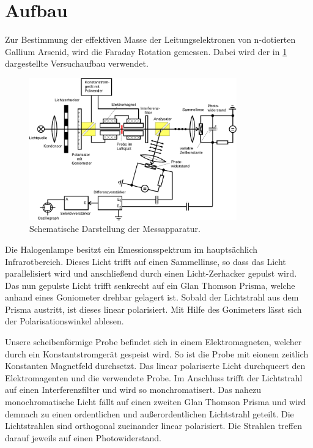 \section{Aufbau}
\label{sec:Aufbau}

Zur Bestimmung der effektiven Masse der Leitungselektronen von n-dotierten Gallium Arsenid, wird die Faraday Rotation
gemessen. Dabei wird der in \ref{fig:apparatur} dargestellte Versuchaufbau verwendet.

\begin{figure}[H]
    \centering
    \includegraphics[width=0.8\textwidth]{content/grafik/apparatur.pdf}
    \caption{Schematische Darstellung der Messapparatur. \cite{faraday}}
    \label{fig:apparatur}
\end{figure}

Die Halogenlampe besitzt ein Emessionsspektrum im hauptsächlich Infrarotbereich. Dieses Licht trifft auf einen
Sammellinse, so dass das Licht parallelisiert wird und anschließend durch einen Licht-Zerhacker gepulst wird.
Das nun gepulste Licht trifft senkrecht auf ein Glan Thomson Prisma, welche anhand eines Goniometer drehbar gelagert ist.
Sobald der Lichtstrahl aus dem Prisma austritt, ist dieses linear polarisiert. Mit Hilfe des Gonimeters lässt sich 
der Polarisationswinkel ablesen. 

Unsere scheibenförmige Probe befindet sich in einem Elektromagneten, welcher durch ein Konstantstromgerät gespeist wird.
So ist die Probe mit eionem zeitlich Konstanten Magnetfeld durchsetzt.
Das linear polariserte Licht durchqueert den Elektromagenten und die verwendete Probe.
Im Anschluss trifft der Lichtstrahl auf einen Interferenzfilter und wird so monchromatisert.
Das nahezu monochromatische Licht fällt auf einen zweiten Glan Thomson Prisma und wird demnach
zu einen ordentlichen und außerordentlichen Lichtstrahl geteilt. Die Lichtstrahlen sind orthogonal zueinander linear polarisiert.
Die Strahlen treffen darauf jeweils auf einen Photowiderstand.

